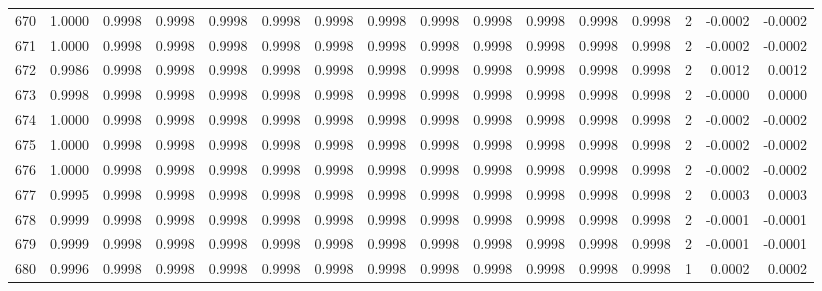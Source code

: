 \begin{tabular}{lrrrrrrrrrrrrrrr}
670 &      1.0000 &  0.9998 &  0.9998 &  0.9998 &  0.9998 &  0.9998 &  0.9998 &  0.9998 &  0.9998 &  0.9998 &   0.9998 &     0.9998 &      2 &                   -0.0002 &                    -0.0002 \\
671 &      1.0000 &  0.9998 &  0.9998 &  0.9998 &  0.9998 &  0.9998 &  0.9998 &  0.9998 &  0.9998 &  0.9998 &   0.9998 &     0.9998 &      2 &                   -0.0002 &                    -0.0002 \\
672 &      0.9986 &  0.9998 &  0.9998 &  0.9998 &  0.9998 &  0.9998 &  0.9998 &  0.9998 &  0.9998 &  0.9998 &   0.9998 &     0.9998 &      2 &                    0.0012 &                     0.0012 \\
673 &      0.9998 &  0.9998 &  0.9998 &  0.9998 &  0.9998 &  0.9998 &  0.9998 &  0.9998 &  0.9998 &  0.9998 &   0.9998 &     0.9998 &      2 &                   -0.0000 &                     0.0000 \\
674 &      1.0000 &  0.9998 &  0.9998 &  0.9998 &  0.9998 &  0.9998 &  0.9998 &  0.9998 &  0.9998 &  0.9998 &   0.9998 &     0.9998 &      2 &                   -0.0002 &                    -0.0002 \\
675 &      1.0000 &  0.9998 &  0.9998 &  0.9998 &  0.9998 &  0.9998 &  0.9998 &  0.9998 &  0.9998 &  0.9998 &   0.9998 &     0.9998 &      2 &                   -0.0002 &                    -0.0002 \\
676 &      1.0000 &  0.9998 &  0.9998 &  0.9998 &  0.9998 &  0.9998 &  0.9998 &  0.9998 &  0.9998 &  0.9998 &   0.9998 &     0.9998 &      2 &                   -0.0002 &                    -0.0002 \\
677 &      0.9995 &  0.9998 &  0.9998 &  0.9998 &  0.9998 &  0.9998 &  0.9998 &  0.9998 &  0.9998 &  0.9998 &   0.9998 &     0.9998 &      2 &                    0.0003 &                     0.0003 \\
678 &      0.9999 &  0.9998 &  0.9998 &  0.9998 &  0.9998 &  0.9998 &  0.9998 &  0.9998 &  0.9998 &  0.9998 &   0.9998 &     0.9998 &      2 &                   -0.0001 &                    -0.0001 \\
679 &      0.9999 &  0.9998 &  0.9998 &  0.9998 &  0.9998 &  0.9998 &  0.9998 &  0.9998 &  0.9998 &  0.9998 &   0.9998 &     0.9998 &      2 &                   -0.0001 &                    -0.0001 \\
680 &      0.9996 &  0.9998 &  0.9998 &  0.9998 &  0.9998 &  0.9998 &  0.9998 &  0.9998 &  0.9998 &  0.9998 &   0.9998 &     0.9998 &      1 &                    0.0002 &                     0.0002 \\

\end{tabular}
